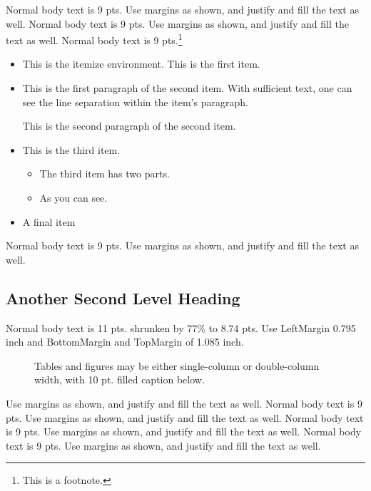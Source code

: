 Normal body text is 9 pts. Use margins as shown, and justify and fill the text as well.   Normal body text is 9 pts. Use margins as shown, and justify and fill the text as well.   Normal body text is 9 pts.\footnote{This is a footnote.}
 
 \begin{itemize}

\item This is the itemize environment.  This is the first item.

\item This is the first paragraph of the second item.  With
sufficient text, one can see the line separation within
the item's paragraph.

This is the second paragraph of the second item.

\item This is the third item.
\begin{itemize}
\item The third item has two parts.

\item As you can see.
\end{itemize}

\item A final item
\end{itemize}



Normal body text is 9 pts.  Use margins as shown, and justify and fill the text as well\cite{STERN}.   



\subsection{Another Second Level Heading}

Normal body text is 11 pts. shrunken by 77\% to 8.74  pts.  Use LeftMargin 0.795 inch 
and BottomMargin and TopMargin of 1.085  inch.

\begin{figure}[htbp]
\centerline{}
\caption{\protect\normalsize Tables and figures may be either single-column 
or double-column width, with 10 pt. filled caption below.\label{fig:BSDCN}}
\end{figure}

Use margins as shown, and justify and fill the text as well.   Normal body text is 9 pts. Use margins as shown, and justify and fill the text as well.   Normal body text is 9 pts.   Use margins as shown, and justify and fill the text as well.   Normal body text is 9 pts. Use margins as shown, and justify and fill the text as well.  

